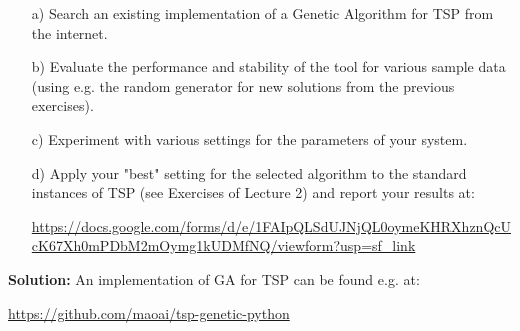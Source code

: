 \begin{enumerate}
\item[a)] Search an existing implementation of a Genetic Algorithm for TSP from the internet.
\item[b)] Evaluate the performance and stability of the tool for various sample data (using e.g. the random generator for new solutions from the previous exercises).
\item[c)] Experiment with various settings for the parameters of your system.
\item[d)] Apply your "best" setting for the selected algorithm to the standard instances of TSP (see Exercises of Lecture 2) and report your results at:

\url{https://docs.google.com/forms/d/e/1FAIpQLSdUJNjQL0oymeKHRXhznQcUcK67Xh0mPDbM2mOymg1kUDMfNQ/viewform?usp=sf_link}
\end{enumerate}

\textbf{Solution:}
An implementation of GA for TSP can be found e.g. at:

\url{https://github.com/maoai/tsp-genetic-python}
